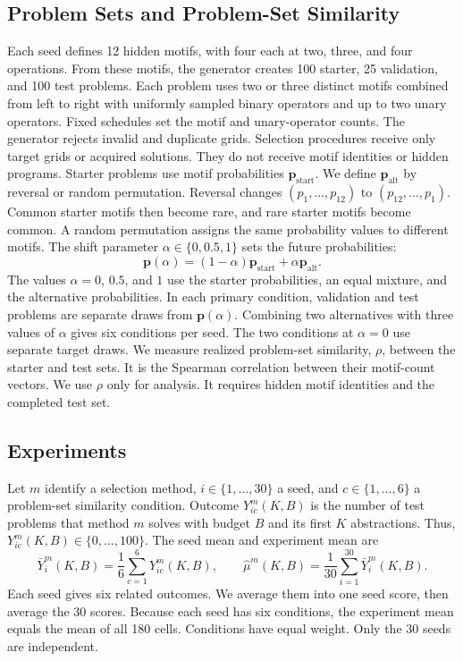 \documentclass[10pt]{article}
\begin{document}
\subsection{Problem Sets and Problem-Set Similarity}

Each seed defines 12 hidden motifs, with four each at two, three, and four
operations. From these motifs, the generator creates 100 starter, 25 validation,
and 100 test problems. Each problem uses two or three distinct motifs combined
from left to right with uniformly sampled binary operators and up to two unary
operators. Fixed schedules set the motif and unary-operator counts. The
generator rejects invalid and duplicate grids. Selection procedures receive
only target grids or acquired solutions. They do not receive motif identities
or hidden programs.
Starter problems use motif probabilities $\mathbf p_{\mathrm{start}}$. We
define $\mathbf p_{\mathrm{alt}}$ by reversal or random permutation. Reversal
changes $(p_1,\ldots,p_{12})$ to $(p_{12},\ldots,p_1)$. Common starter motifs
then become rare, and rare starter motifs become common. A random permutation
assigns the same probability values to different motifs. The shift parameter
$\alpha\in\{0,0.5,1\}$ sets the future probabilities:
\[
  \mathbf p(\alpha)
    =(1-\alpha)\mathbf p_{\mathrm{start}}
      +\alpha\mathbf p_{\mathrm{alt}}.
\]
The values $\alpha=0$, $0.5$, and $1$ use the starter probabilities, an equal
mixture, and the alternative probabilities. In each primary condition,
validation and test problems are separate draws from $\mathbf p(\alpha)$.
Combining two alternatives with three values of $\alpha$ gives six conditions
per seed. The two conditions at $\alpha=0$ use separate target draws. We
measure realized problem-set similarity, $\rho$, between the starter and test
sets. It is the Spearman correlation between their motif-count vectors. We use
$\rho$ only for analysis. It requires hidden motif identities and the completed
test set.

\subsection{Experiments}

Let $m$ identify a selection method, $i\in\{1,\ldots,30\}$ a seed, and
$c\in\{1,\ldots,6\}$ a problem-set similarity condition. Outcome
$Y_{ic}^{m}(K,B)$ is the number of test problems that method $m$ solves with
budget $B$ and its first $K$ abstractions. Thus,
$Y_{ic}^{m}(K,B)\in\{0,\ldots,100\}$. The seed mean and
experiment mean are
\begin{equation}
  \bar Y_i^{m}(K,B)=\frac{1}{6}\sum_{c=1}^{6}Y_{ic}^{m}(K,B),
  \qquad
  \widehat\mu^{m}(K,B)=\frac{1}{30}\sum_{i=1}^{30}\bar Y_i^{m}(K,B).
\end{equation}
Each seed gives six related outcomes. We average them into one seed score, then
average the 30 scores. Because each seed has six conditions, the experiment
mean equals the mean of all 180 cells. Conditions have equal weight. Only the
30 seeds are independent.
\end{document}
